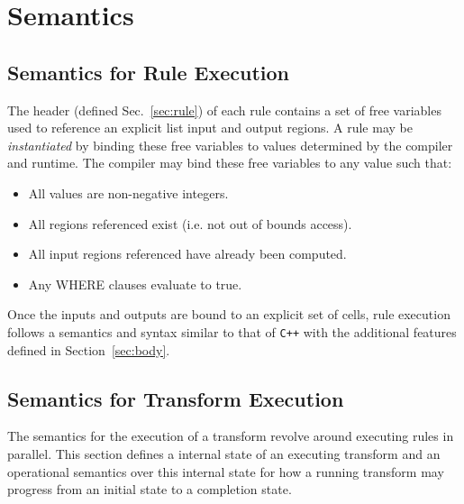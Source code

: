 \documentclass[11pt]{article}
\begin{document}
\section{Semantics}

\subsection{Semantics for Rule Execution}

The header (defined Sec.~\ref{sec:rule}) of each rule contains a set of
free variables used to reference an explicit list input and output regions.
A rule may be {\em instantiated} by binding these free variables to values
determined by the compiler and runtime.  The compiler may bind these free
variables to any value such that:
\begin{itemize}
\item All values are non-negative integers.
\item All regions referenced exist (i.e. not out of bounds access).
\item All input regions referenced have already been computed.
\item Any WHERE clauses evaluate to true.
\end{itemize}

Once the inputs and outputs are bound to an explicit set of cells, rule
execution follows a semantics and syntax similar to that of {\tt C++} with
the additional features defined in Section~\ref{sec:body}.


\subsection{Semantics for Transform Execution}

The semantics for the execution of a transform revolve around executing
rules in parallel.  This section defines a internal state of an executing
transform and an operational semantics over this internal state for how a
running transform may progress from an initial state to a completion state.
\end{document}
